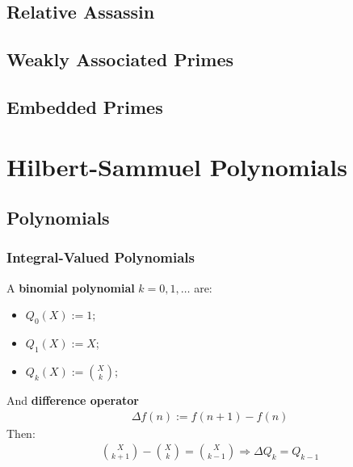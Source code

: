 \documentclass[Total.tex]{subfiles}
\begin{document}
		\section{Relative Assassin}
		\section{Weakly Associated Primes}
		\section{Embedded Primes}
	\chapter{Hilbert-Sammuel Polynomials}
	
		\section{Polynomials}
			\subsection{Integral-Valued Polynomials}
				\begin{Def}
					A \textbf{binomial polynomial} $k=0,1,\dots$ are:
					\begin{itemize}
						\item $Q_0(X):=1$;
						\item $Q_1(X):=X$;
						\item $Q_k(X):=\binom{X}{k}$;
					\end{itemize}
				\end{Def}
				
				And \textbf{difference operator}
				\begin{gather*}
					\Delta f(n):=f(n+1)-f(n)
				\end{gather*}
				Then:
				\begin{gather*}
					\binom{X}{k+1}-\binom{X}{k}=\binom{X}{k-1}\Rightarrow \Delta Q_k=Q_{k-1}
				\end{gather*}
				
\end{document}
